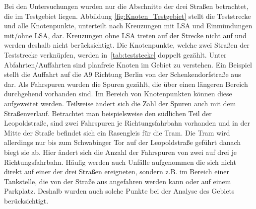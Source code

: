 Bei den Untersuchungen wurden nur die Abschnitte der drei Straßen betrachtet, die im Testgebiet liegen. Abbildung \ref{fig:Knoten_Testgebiet} stellt die Teststrecke und alle Knotenpunkte, unterteilt nach Kreuzungen mit LSA und Einmündungen mit/ohne LSA, dar. Kreuzungen ohne LSA treten auf der Strecke nicht auf und werden deshalb nicht berücksichtigt. Die Knotenpunkte, welche zwei Straßen der Teststrecke verknüpfen, werden in~\autoref{tab:teststecke} doppelt gezählt. Unter Abfahrten/Auffahrten sind planfreie Knoten im Gebiet zu verstehen. Ein Beispiel stellt die Auffahrt auf die A9 Richtung Berlin von der Schenkendorfstraße aus dar. Als Fahrspuren wurden die Spuren gezählt, die über einen längeren Bereich durchgehend vorhanden sind. Im Bereich von Knotenpunkten können diese aufgeweitet werden. Teilweise ändert sich die Zahl der Spuren auch mit dem Straßenverlauf. Betrachtet man beispielsweise den südlichen Teil der Leopoldstraße, sind zwei Fahrspuren je Richtungsfahrbahn vorhanden und in der Mitte der Straße befindet sich ein Rasengleis für die Tram. Die Tram wird allerdings nur bis zum Schwabinger Tor auf der Leopoldstraße geführt danach biegt sie ab. Hier ändert sich die Anzahl der Fahrspuren von zwei auf drei je Richtungsfahrbahn. Häufig werden auch Unfälle aufgenommen die sich nicht direkt auf einer der drei Straßen ereigneten, sondern z.B. im Bereich einer Tankstelle, die von der Straße aus angefahren werden kann oder auf einem Parkplatz. Deshalb wurden auch solche Punkte bei der Analyse des Gebiets berücksichtigt.

